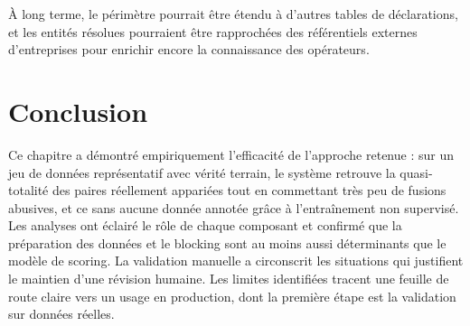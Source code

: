 À long terme, le périmètre pourrait être étendu à d'autres tables de déclarations, et les entités résolues pourraient être rapprochées des référentiels externes d'entreprises pour enrichir encore la connaissance des opérateurs.

\section*{Conclusion}

Ce chapitre a démontré empiriquement l'efficacité de l'approche retenue : sur un jeu de données représentatif avec vérité terrain, le système retrouve la quasi-totalité des paires réellement appariées tout en commettant très peu de fusions abusives, et ce sans aucune donnée annotée grâce à l'entraînement non supervisé. Les analyses ont éclairé le rôle de chaque composant et confirmé que la préparation des données et le blocking sont au moins aussi déterminants que le modèle de scoring. La validation manuelle a circonscrit les situations qui justifient le maintien d'une révision humaine. Les limites identifiées tracent une feuille de route claire vers un usage en production, dont la première étape est la validation sur données réelles.
